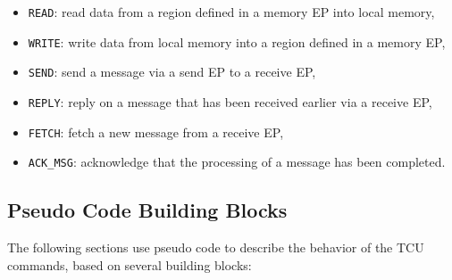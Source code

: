\documentclass[a4paper,11pt,draft]{article}
\begin{document}
\begin{itemize}
  \item \texttt{READ}: read data from a region defined in a memory EP into local memory,
  \item \texttt{WRITE}: write data from local memory into a region defined in a memory EP,
  \item \texttt{SEND}: send a message via a send EP to a receive EP,
  \item \texttt{REPLY}: reply on a message that has been received earlier via a receive EP,
  \item \texttt{FETCH}: fetch a new message from a receive EP,
  \item \texttt{ACK\_MSG}: acknowledge that the processing of a message has been completed.
\end{itemize}

\subsection{Pseudo Code Building Blocks}

The following sections use pseudo code to describe the behavior of the TCU commands, based on
several building blocks:
\end{document}
